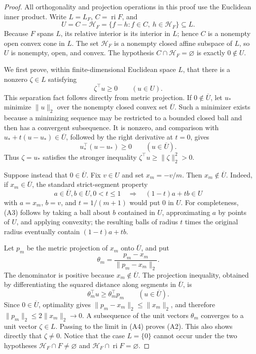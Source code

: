 \documentclass{article}
\begin{document}
\begin{proof}
All orthogonality and projection operations in this proof use the Euclidean inner product.  Write \(L=L_F\), \(C=\operatorname{ri}F\), and
\[
 U=C-\mathcal H_F=\{f-h:f\in C,\ h\in\mathcal H_F\}\subseteq L.       \tag{A1}
\]
Because \(F\) spans \(L\), its relative interior is its interior in \(L\); hence \(C\) is a nonempty open convex cone in \(L\).  The set \(\mathcal H_F\) is a nonempty closed affine subspace of \(L\), so \(U\) is nonempty, open, and convex.  The hypothesis \(C\cap\mathcal H_F=\varnothing\) is exactly \(0\notin U\).

We first prove, within finite-dimensional Euclidean space \(L\), that there is a nonzero \(\zeta\in L\) satisfying
\[
 \zeta^{\top}u\geq0\qquad(u\in U).                                    \tag{A2}
\]
This separation fact follows directly from metric projection.  If \(0\notin\overline U\), let \(u_*\) minimize \(\|u\|_2\) over the nonempty closed convex set \(\overline U\).  Such a minimizer exists because a minimizing sequence may be restricted to a bounded closed ball and then has a convergent subsequence.  It is nonzero, and comparison with \(u_*+t(u-u_*)\in\overline U\), followed by the right derivative at \(t=0\), gives
\[
 u_*^{\top}(u-u_*)\geq0\qquad(u\in\overline U).
\]
Thus \(\zeta=u_*\) satisfies the stronger inequality \(\zeta^{\top}u\geq\|\zeta\|_2^2>0\).

Suppose instead that \(0\in\overline U\).  Fix \(v\in U\) and set \(x_m=-v/m\).  Then \(x_m\notin\overline U\).  Indeed, if \(x_m\in\overline U\), the standard strict-segment property
\[
 a\in\overline U, b\in U, 0<t\leq1
 \quad\Longrightarrow\quad (1-t)a+tb\in U                            \tag{A3}
\]
with \(a=x_m\), \(b=v\), and \(t=1/(m+1)\) would put \(0\) in \(U\).  For completeness, (A3) follows by taking a ball about \(b\) contained in \(U\), approximating \(a\) by points of \(U\), and applying convexity; the resulting balls of radius \(t\) times the original radius eventually contain \((1-t)a+tb\).

Let \(p_m\) be the metric projection of \(x_m\) onto \(\overline U\), and put
\[
 \theta_m=\frac{p_m-x_m}{\|p_m-x_m\|_2}.
\]
The denominator is positive because \(x_m\notin\overline U\).  The projection inequality, obtained by differentiating the squared distance along segments in \(\overline U\), is
\[
 \theta_m^{\top}u\geq\theta_m^{\top}p_m
 \qquad(u\in\overline U).                                               \tag{A4}
\]
Since \(0\in\overline U\), optimality gives
\(\|p_m-x_m\|_2\leq\|x_m\|_2\), and therefore
\(\|p_m\|_2\leq2\|x_m\|_2\to0\).  A subsequence of the unit vectors \(\theta_m\) converges to a unit vector \(\zeta\in L\).  Passing to the limit in (A4) proves (A2).  This also shows directly that \(\zeta\ne0\).  Notice that the case \(L=\{0\}\) cannot occur under the two hypotheses \(\mathcal H_F\cap F\ne\varnothing\) and \(\mathcal H_F\cap\operatorname{ri}F=\varnothing\).


\end{proof}
\end{document}

